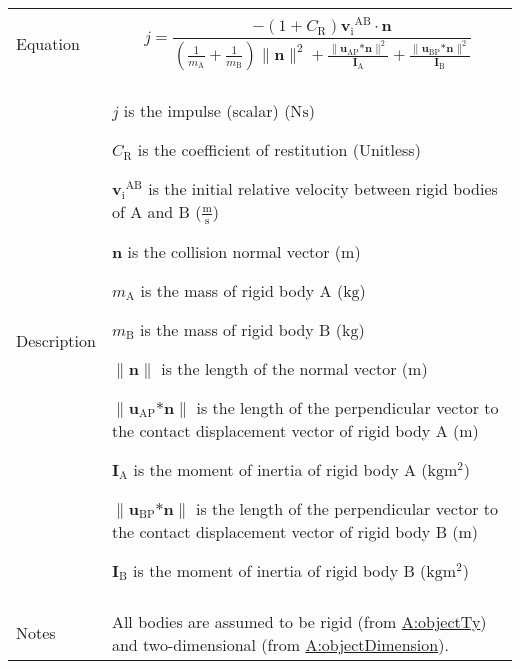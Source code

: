 \documentclass[12pt]{article}
\begin{document}
\begin{minipage}{\textwidth}
\begin{tabular}{>{\raggedright}p{}>{\raggedright\arraybackslash}p{}}
\\ \midrule \\
Equation & \begin{displaymath}
           j=\frac{-\left(1+{C_{\text{R}}}\right) {{\symbf{v}_{\text{i}}}^{\text{A}\text{B}}}\cdot{}\symbf{n}}{\left(\frac{1}{{m_{\text{A}}}}+\frac{1}{{m_{\text{B}}}}\right) \|\symbf{n}\|^{2}+\frac{\|{\symbf{u}_{\text{A}\text{P}}}\text{*}\symbf{n}\|^{2}}{{\symbf{I}_{\text{A}}}}+\frac{\|{\symbf{u}_{\text{B}\text{P}}}\text{*}\symbf{n}\|^{2}}{{\symbf{I}_{\text{B}}}}}
           \end{displaymath}
\\ \midrule \\
Description & \begin{symbDescription}
              \item{$j$ is the impulse (scalar) ($\text{N}\text{s}$)}
              \item{${C_{\text{R}}}$ is the coefficient of restitution (Unitless)}
              \item{${{\symbf{v}_{\text{i}}}^{\text{A}\text{B}}}$ is the initial relative velocity between rigid bodies of A and B ($\frac{\text{m}}{\text{s}}$)}
              \item{$\symbf{n}$ is the collision normal vector (${\text{m}}$)}
              \item{${m_{\text{A}}}$ is the mass of rigid body A (${\text{kg}}$)}
              \item{${m_{\text{B}}}$ is the mass of rigid body B (${\text{kg}}$)}
              \item{$\|\symbf{n}\|$ is the length of the normal vector (${\text{m}}$)}
              \item{$\|{\symbf{u}_{\text{A}\text{P}}}\text{*}\symbf{n}\|$ is the length of the perpendicular vector to the contact displacement vector of rigid body A (${\text{m}}$)}
              \item{${\symbf{I}_{\text{A}}}$ is the moment of inertia of rigid body A ($\text{kg}\text{m}^{2}$)}
              \item{$\|{\symbf{u}_{\text{B}\text{P}}}\text{*}\symbf{n}\|$ is the length of the perpendicular vector to the contact displacement vector of rigid body B (${\text{m}}$)}
              \item{${\symbf{I}_{\text{B}}}$ is the moment of inertia of rigid body B ($\text{kg}\text{m}^{2}$)}
              \end{symbDescription}
\\ \midrule \\
Notes & All bodies are assumed to be rigid (from \hyperref[assumpOT]{A:objectTy}) and two-dimensional (from \hyperref[assumpOD]{A:objectDimension}).
        

\end{tabular}
\end{minipage}
\end{document}
